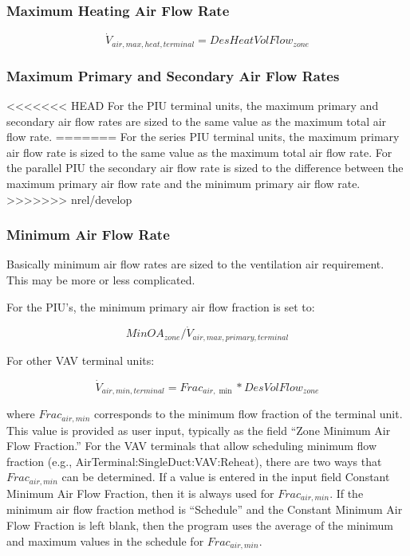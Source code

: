 \subsubsection{Maximum Heating Air Flow Rate}\label{maximum-heating-air-flow-rate}

\begin{equation}
{\dot V_{air,max,heat,terminal}} = DesHeatVolFlow_{zone}
\end{equation}

\subsubsection{Maximum Primary and Secondary Air Flow Rates}\label{maximum-primary-and-secondary-air-flow-rates}

<<<<<<< HEAD
For the PIU terminal units, the maximum primary and secondary air flow rates are sized to the same value as the maximum total air flow rate.
=======
For the series PIU terminal units, the maximum primary air flow rate is sized to the same value as the maximum total air flow rate. For the parallel PIU the secondary air flow rate is sized to the difference between the maximum primary air flow rate and the minimum primary air flow rate.
>>>>>>> nrel/develop

\subsubsection{Minimum Air Flow Rate}\label{minimum-air-flow-rate}

Basically minimum air flow rates are sized to the ventilation air requirement. This may be more or less complicated.

For the PIU's, the minimum primary air flow fraction is set to:

\begin{equation}
{MinOA}_{zone} /{\dot V_{air,max,primary,terminal}}
\end{equation}

For other VAV terminal units:

\begin{equation}
{\dot V_{air,min,terminal}} = Fra{c_{air,\min }}*DesVolFlow_{zone}
\end{equation}

where \emph{\(Frac_{air,min}\)} corresponds to the minimum flow fraction of the terminal unit. This value is provided as user input, typically as the field ``Zone Minimum Air Flow Fraction.'' For the VAV terminals that allow scheduling minimum flow fraction (e.g., AirTerminal:SingleDuct:VAV:Reheat), there are two ways that \emph{\(Frac_{air,min}\)} can be determined. If a value is entered in the input field Constant Minimum Air Flow Fraction, then it is always used for \emph{\(Frac_{air,min}\)}. If the minimum air flow fraction method is ``Schedule'' and the Constant Minimum Air Flow Fraction is left blank, then the program uses the average of the minimum and maximum values in the schedule for \emph{\(Frac_{air,min}\)}.

